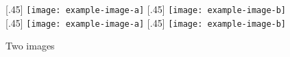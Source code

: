 \documentclass{article}
\begin{document}
\begin{figure}[ht]
  [.45\linewidth]{%
    \texttt{[image: example-image-a]}%
  }%
  \hfill
  [.45\linewidth]{%
    \texttt{[image: example-image-b]}%
  }
    [.45\linewidth]{%
    \texttt{[image: example-image-a]}%
  }%
  \hfill
  [.45\linewidth]{%
    \texttt{[image: example-image-b]}%
  }
  \caption{Two images}
\end{figure}
\end{document}
